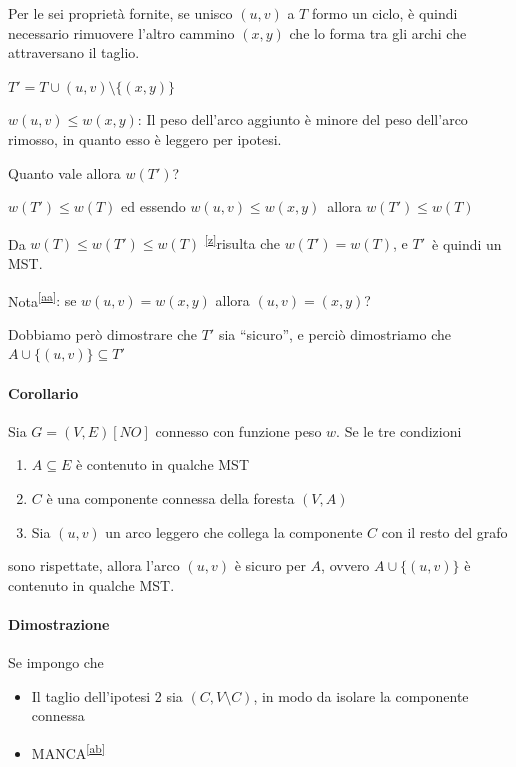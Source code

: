 {Per le sei proprietà fornite, se unisco $(u,v)$ a $T$ formo un ciclo, è quindi necessario rimuovere l'altro cammino $(x,y)$ che lo forma tra gli archi che attraversano il taglio. }

$T' = T \cup {(u,v)} \setminus \{(x,y)\} $



$w(u,v) \leq w(x,y)${: Il peso dell'arco aggiunto è minore del peso dell'arco rimosso, in quanto esso è leggero per ipotesi.}

{Quanto vale allora $w(T')$? }

$w(T') \leq w(T)$ {ed essendo }$w(u,v) \leq w(x,y)${~allora $w(T') \leq w(T)$}

{Da }$w(T) \leq w(T') \leq w(T)$ \textsuperscript{\protect\hyperlink{cmnt26}{{[}z{]}}}{risulta che $w(T') = w(T)$, e }$T'${~è quindi un MST.}

{Nota}\textsuperscript{\protect\hyperlink{cmnt27}{{[}aa{]}}}{: se $w(u,v) = w(x,y)$ allora $(u,v) = (x,y)$?}

{Dobbiamo però dimostrare che $T'$ sia ``sicuro'', e perciò dimostriamo che \\ $A \cup \{(u,v)\} \subseteq T'$}

\paragraph{Corollario}

{Sia $G=(V,E) [NO]$ connesso con funzione peso $w$. Se le tre condizioni}

\begin{enumerate}
\tightlist
\item
  {$A \subseteq E$ è contenuto in qualche MST}
\item
  {$C$ è una componente connessa della foresta $(V,A)$}
\item
  {Sia $(u,v)$ un arco leggero che collega la componente $C$ con il resto del grafo}
\end{enumerate}

{sono rispettate, allora l'arco $(u,v)$ è sicuro per $A$, ovvero $A \cup \{(u,v)\}$ è contenuto in qualche MST.}

\paragraph{Dimostrazione}

{Se impongo che}

\begin{itemize}
\tightlist
\item
  {Il taglio dell'ipotesi 2 sia $(C,V\setminus C)$, in modo da isolare la componente connessa}
\item
  {MANCA}\textsuperscript{\protect\hyperlink{cmnt28}{{[}ab{]}}}
\end{itemize}

